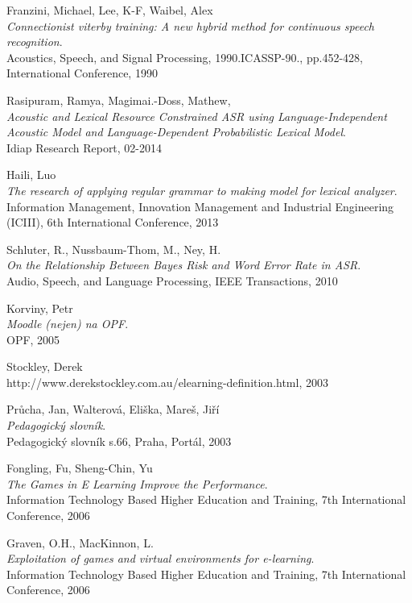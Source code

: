 \begin{thebibliography}{99}
  {\sc Franzini,} Michael, {\sc Lee,} K-F, {\sc Waibel,} Alex\\
  \emph{Connectionist viterby training: A new hybrid method for continuous speech recognition}.\\
  Acoustics, Speech, and Signal Processing, 1990.ICASSP-90., pp.452-428, International Conference, 1990
  
  {\sc Rasipuram,} Ramya, {\sc Magimai.-Doss,} Mathew, \\
  \emph{Acoustic and Lexical Resource Constrained ASR using Language-Independent Acoustic Model and Language-Dependent Probabilistic Lexical Model}.\\
  Idiap Research Report, 02-2014

  {\sc Haili,} Luo\\
  \emph{The research of applying regular grammar to making model for lexical analyzer}.\\
  Information Management, Innovation Management and Industrial Engineering (ICIII), 6th International Conference, 2013
  
  {\sc Schluter,} R., {\sc Nussbaum-Thom,} M., {\sc Ney,} H.\\
  \emph{On the Relationship Between Bayes Risk and Word Error Rate in ASR}.\\
  Audio, Speech, and Language Processing, IEEE Transactions, 2010

  {\sc Korviny,} Petr\\
  \emph{Moodle (nejen) na OPF}.\\
  OPF, 2005

  {\sc Stockley,} Derek\\
  http://www.derekstockley.com.au/elearning-definition.html, 2003

  {\sc Průcha,} Jan, {\sc Walterová,} Eliška, {\sc Mareš,} Jiří\\
  \emph{Pedagogický slovník}.\\
  Pedagogický slovník s.66, Praha, Portál, 2003

  {\sc Fongling,} Fu, {\sc Sheng-Chin,} Yu\\
  \emph{The Games in E Learning Improve the Performance}.\\
  Information Technology Based Higher Education and Training, 7th International Conference, 2006

  {\sc Graven,} O.H., {\sc MacKinnon,} L.\\
  \emph{Exploitation of games and virtual environments for e-learning}.\\
  Information Technology Based Higher Education and Training, 7th International Conference, 2006


\end{thebibliography}
